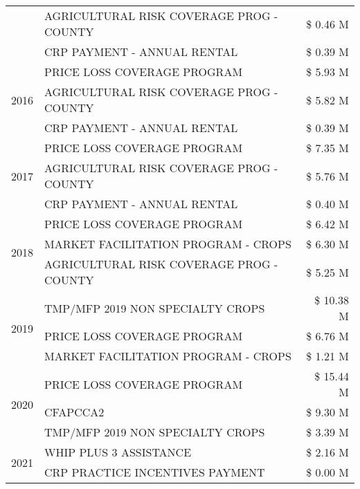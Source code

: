 \begin{tabular}{llr}
 & AGRICULTURAL RISK COVERAGE PROG - COUNTY & \$ 0.46 M \\
 & CRP PAYMENT - ANNUAL RENTAL & \$ 0.39 M \\
\cline{1-3}
\multirow[t]{3}{*}{2016} & PRICE LOSS COVERAGE PROGRAM & \$ 5.93 M \\
 & AGRICULTURAL RISK COVERAGE PROG - COUNTY & \$ 5.82 M \\
 & CRP PAYMENT - ANNUAL RENTAL & \$ 0.39 M \\
\cline{1-3}
\multirow[t]{3}{*}{2017} & PRICE LOSS COVERAGE PROGRAM & \$ 7.35 M \\
 & AGRICULTURAL RISK COVERAGE PROG - COUNTY & \$ 5.76 M \\
 & CRP PAYMENT - ANNUAL RENTAL & \$ 0.40 M \\
\cline{1-3}
\multirow[t]{3}{*}{2018} & PRICE LOSS COVERAGE PROGRAM & \$ 6.42 M \\
 & MARKET FACILITATION PROGRAM - CROPS & \$ 6.30 M \\
 & AGRICULTURAL RISK COVERAGE PROG - COUNTY & \$ 5.25 M \\
\cline{1-3}
\multirow[t]{3}{*}{2019} & TMP/MFP 2019 NON SPECIALTY CROPS & \$ 10.38 M \\
 & PRICE LOSS COVERAGE PROGRAM & \$ 6.76 M \\
 & MARKET FACILITATION PROGRAM - CROPS & \$ 1.21 M \\
\cline{1-3}
\multirow[t]{3}{*}{2020} & PRICE LOSS COVERAGE PROGRAM & \$ 15.44 M \\
 & CFAPCCA2 & \$ 9.30 M \\
 & TMP/MFP 2019 NON SPECIALTY CROPS & \$ 3.39 M \\
\cline{1-3}
\multirow[t]{2}{*}{2021} & WHIP PLUS 3 ASSISTANCE & \$ 2.16 M \\
 & CRP PRACTICE INCENTIVES PAYMENT & \$ 0.00 M \\
\cline{1-3}
\bottomrule
\end{tabular}

